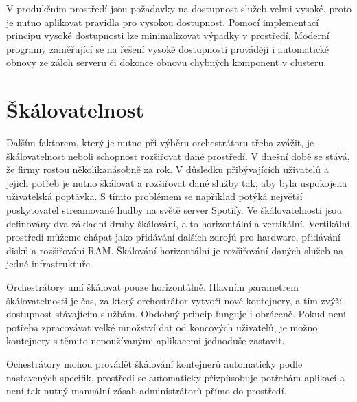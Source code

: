 V produkčním prostředí jsou požadavky na dostupnost služeb velmi vysoké, proto je nutno aplikovat pravidla pro vysokou dostupnost. Pomocí implementací principu vysoké dostupnosti lze minimalizovat výpadky v prostředí. Moderní programy zaměřující se na řešení vysoké dostupnosti provádějí i automatické obnovy ze záloh serveru či dokonce obnovu chybných komponent v clusteru. 

\section{Škálovatelnost}
Dalším faktorem, který je nutno při výběru orchestrátoru třeba zvážit, je škálovatelnost neboli schopnost rozšiřovat dané prostředí. V dnešní době se stává, že firmy rostou několikanásobně za rok. V důsledku přibývajících uživatelů a jejich potřeb je nutno škálovat a rozšiřovat dané služby tak, aby byla uspokojena uživatelská poptávka. S tímto problémem se například potýká největší poskytovatel streamované hudby na světě server Spotify.
Ve škálovatelnosti jsou definovány dva základní druhy škálování, a to horizontální a vertikální. Vertikální prostředí můžeme chápat jako přidávání dalších zdrojů pro hardware, přidávání disků a rozšiřování RAM. Škálování horizontální je rozšiřování daných služeb na jedné infrastruktuře.

Orchestrátory umí škálovat pouze horizontálně. Hlavním parametrem škálovatelnosti je čas, za který orchestrátor vytvoří nové kontejnery, a tím zvýší dostupnost stávajícím službám. Obdobný princip funguje i obráceně. Pokud není potřeba zpracovávat velké množství dat od koncových uživatelů, je možno kontejnery s těmito nepoužívanými aplikacemi jednoduše zastavit. 

Ochestrátory mohou provádět škálování kontejnerů automaticky podle nastavených specifik, prostředí se  automaticky přizpůsobuje potřebám aplikací a není tak nutný manuální zásah administrátorů přímo do prostředí.

